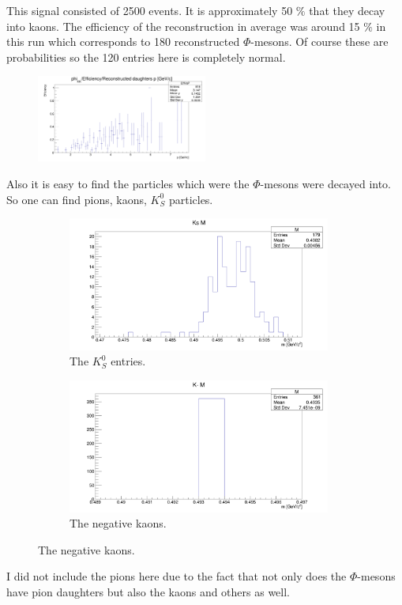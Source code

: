 \documentclass[a4paper,12pt]{article}
\begin{document}
\par This signal consisted of 2500 events. It is approximately 50 $\%$ that they decay into kaons. The efficiency of the reconstruction in average was around 15 $\%$ in this run which corresponds to 180 reconstructed $\Phi$-mesons. Of course these are probabilities so the 120 entries here is completely normal.
\begin{figure}[H]
	\centering
	\includegraphics[width=0.5\textwidth]{reconstructed_eff_phi2500.png}
\end{figure}
\par Also it is easy to find the particles which were the $\Phi$-mesons were decayed into. So one can find pions, kaons, $K^{0}_{S}$ particles.
\begin{figure}[H]
	\centering
	\begin{subfigure}{0.49\textwidth}
		\centering
		\includegraphics[width=0.95\textwidth]{kshort_phi2500.png}
		\caption{ The $K^{0}_{S}$ entries. }
	\end{subfigure}
	\begin{subfigure}{0.49\textwidth}
		\centering
		\includegraphics[width=0.95\textwidth]{k-_phi2500.png}
		\caption{ The negative kaons. }
	\end{subfigure}
\end{figure}
\par I did not include the pions here due to the fact that not only does the $\Phi$-mesons have pion daughters but also the kaons and others as well.
\end{document}
